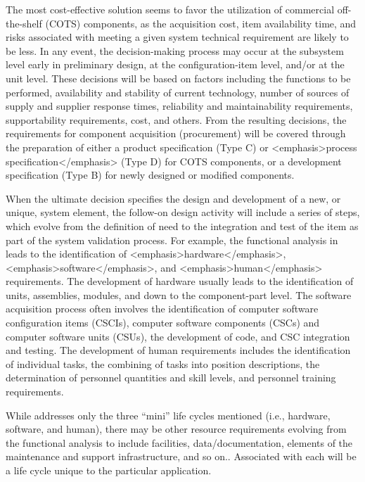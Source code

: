 The most cost-effective solution seems to favor the utilization of commercial off-the-shelf (COTS) components, as the acquisition cost, item availability time, and risks associated with meeting a given system technical requirement are likely to be less. In any event, the decision-making process may occur at the subsystem level early in preliminary design, at the configuration-item level, and/or at the unit level. These decisions will be based on factors including the functions to be performed, availability and stability of current technology, number of sources of supply and supplier response times, reliability and maintainability requirements, supportability requirements, cost, and others. From the resulting decisions, the requirements for component acquisition (procurement) will be covered through the preparation of either a product specification (Type C) or <emphasis>process specification</emphasis> (Type D) for COTS components, or a development specification (Type B) for newly designed or modified components.

When the ultimate decision specifies the design and development of a new, or unique, system element, the follow-on design activity will include a series of steps, which evolve from the definition of need to the integration and test of the item as part of the system validation process. For example, the functional analysis in leads to the identification of <emphasis>hardware</emphasis>, <emphasis>software</emphasis>, and <emphasis>human</emphasis> requirements. The development of hardware usually leads to the identification of units, assemblies, modules, and down to the component-part level. The software acquisition process often involves the identification of computer software configuration items (CSCIs), computer software components (CSCs) and computer software units (CSUs), the development of code, and CSC integration and testing. The development of human requirements includes the identification of individual tasks, the combining of tasks into position descriptions, the determination of personnel quantities and skill levels, and personnel training requirements.

While  addresses only the three ``mini'' life cycles mentioned (i.e., hardware, software, and human), there may be other resource requirements evolving from the functional analysis to include facilities, data/documentation, elements of the maintenance and support infrastructure, and so on.. Associated with each will be a life cycle unique to the particular application.

